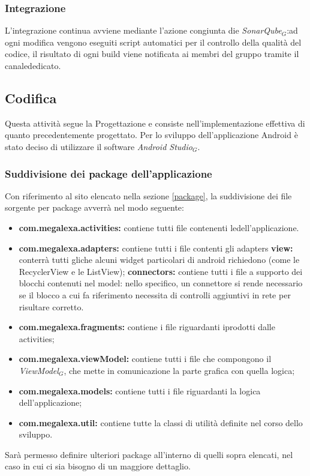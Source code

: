 \subsubsection{Integrazione}
L'integrazione continua avviene mediante l'azione congiunta die \textit{SonarQube$_{G}$}:ad ogni modifica vengono eseguiti script automatici per il controllo della qualità del codice, il risultato di ogni build viene notificata ai membri del gruppo tramite il canalededicato.

\subsection{Codifica}
Questa attività segue la Progettazione e consiste nell'implementazione effettiva di quanto precedentemente progettato. Per lo sviluppo dell'applicazione Android è stato deciso di utilizzare il software \textit{Android Studio$_{G}$}.
\subsubsection{Suddivisione dei package dell'applicazione}
Con riferimento al sito elencato nella sezione \ref{package}, la suddivisione dei file sorgente per package avverrà nel modo seguente:

\begin{itemize}
	\item  \textbf{com.megalexa.activities:} contiene tutti file contenenti ledell'applicazione.
	\item  \textbf{com.megalexa.adapters:} contiene tutti i file contenti gli adapters
			\subitem \textbf{view:} conterrà tutti gliche alcuni widget particolari di android richiedono (come le RecyclerView e le ListView);
			\subitem \textbf{connectors:} contiene tutti i file a supporto dei blocchi contenuti nel model: nello specifico, un connettore si rende necessario se il blocco a cui fa riferimento necessita di controlli aggiuntivi in rete per risultare corretto.
	\item  \textbf{com.megalexa.fragments:} contiene i file riguardanti iprodotti dalle activities;
	\item  \textbf{com.megalexa.viewModel:}	contiene tutti i file che compongono il \textit{ViewModel$_{G}$}, che mette in comunicazione la parte grafica con quella logica;	
	\item  \textbf{com.megalexa.models:} contiene tutti i file riguardanti la logica dell'applicazione;
	\item  \textbf{com.megalexa.util:} contiene tutte la classi di utilità definite nel corso dello sviluppo.	

\end{itemize}
Sarà permesso definire ulteriori package all'interno di quelli sopra elencati, nel caso in cui ci sia bisogno di un maggiore dettaglio.
